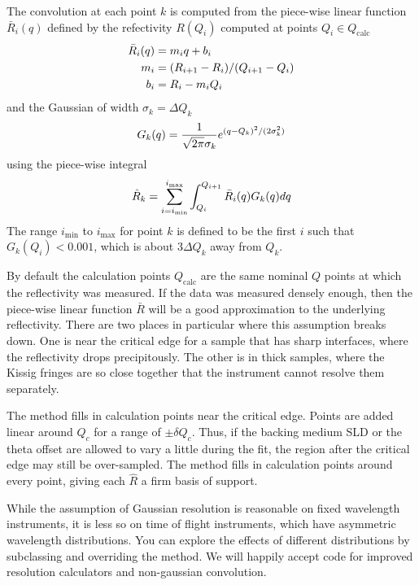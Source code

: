 \documentclass[letterpaper,10pt,english]{sphinxmanual}
\begin{document}
The convolution at each point $k$ is computed from the piece-wise linear
function $\bar R_i(q)$ defined by the refectivity $R(Q_i)$ computed
at points $Q_i \in Q_\text{calc}$
\begin{gather}
\begin{split}\bar R_i(q) &= m_i q + b_i \\
m_i &= (R_{i+1} - R_i)/(Q_{i+1} - Q_i) \\
b_i &= R_i - m_i Q_i\end{split}\notag
\end{gather}
and the Gaussian of width $\sigma_k = \Delta Q_k$
\begin{gather}
\begin{split}G_k(q) = \frac{1}{\sqrt{2 \pi}\sigma_k} e^{(q-Q_k)^2 / (2 \sigma_k^2)}\end{split}\notag
\end{gather}
using the piece-wise integral
\begin{gather}
\begin{split}\hat R_k = \sum_{i=i_\text{min}}^{i_\text{max}}
    \int_{Q_i}^{Q_{i+1}} \bar R_i(q) G_k(q) dq\end{split}\notag
\end{gather}
The range $i_\text{min}$ to $i_\text{max}$ for point $k$ is defined
to be the first $i$ such that $G_k(Q_i) < 0.001$, which is
about $3 \Delta Q_k$ away from $Q_k$.

By default the calculation points $Q_\text{calc}$ are the same
nominal $Q$ points at which the reflectivity was measured.   If the
data was measured densely enough, then the piece-wise linear function
$\bar R$ will be a good approximation to the underlying reflectivity.
There are two places in particular where this assumption breaks down.
One is near the critical edge for a sample that has sharp interfaces,
where the reflectivity drops precipitously. The other is in thick
samples, where the Kissig fringes are so close together that the
instrument cannot resolve them separately.

The method  fills in calculation points
near the critical edge.  Points are added linear around $Q_c$ for
a range of $\pm \delta Q_c$.  Thus, if the backing medium SLD or
the theta offset are allowed to vary a little during the fit, the
region after the critical edge may still be over-sampled.
The method  fills in calculation points
around every point, giving each $\hat R$ a firm basis of support.

While the assumption of Gaussian resolution is reasonable on fixed
wavelength instruments, it is less  so on time of flight instruments,
which have asymmetric wavelength  distributions.  You can explore the
effects of different distributions by subclassing
{\hyperref[api/probe:refl1d.probe.Probe]{}}  and overriding the
 method.  We will happily accept code for
improved resolution calculators and non-gaussian convolution.
\end{document}
